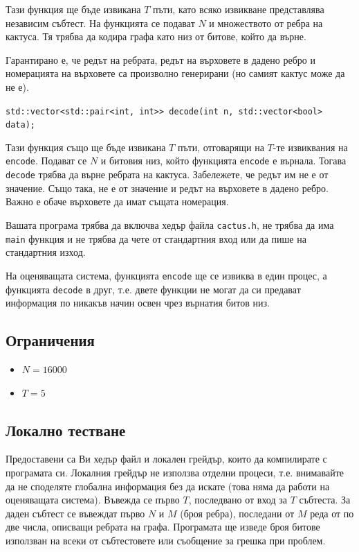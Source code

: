 \documentclass[12pt]{article}
\begin{document}
Тази функция ще бъде извикана $T$ пъти, като всяко извикване представлява независим събтест. На функцията се подават $N$ и множеството от ребра на кактуса. Тя трябва да кодира графа като низ от битове, който да върне.

Гарантирано е, че редът на ребрата, редът на върховете в дадено ребро и номерацията на върховете са произволно генерирани (но самият кактус може да не е).

{\footnotesize \verb|std::vector<std::pair<int, int>> decode(int n, std::vector<bool> data);|}

Тази функция също ще бъде извикана $T$ пъти, отговарящи на $T$-те извиквания на \verb|encode|. Подават се $N$ и битовия низ, който функцията \verb|encode| е върнала. Тогава \verb|decode| трябва да върне ребрата на кактуса. Забележете, че редът им не е от значение. Също така, не е от значение и редът на върховете в дадено ребро. Важно е обаче върховете да имат същата номерация.

Вашата програма трябва да включва хедър файла \verb|cactus.h|, не трябва да има \verb|main| функция и не трябва да чете от стандартния вход или да пише на стандартния изход.

На оценяващата система, функцията \verb|encode| ще се извиква в един процес, а функцията \verb|decode| в друг, т.е. двете функции не могат да си предават информация по никакъв начин освен чрез върнатия битов низ.

\subsection{Ограничения}

\vspace{0.1em}

\begin{itemize}
\item $ N = 16000 $
\item $ T = 5 $
\end{itemize}

\subsection{Локално тестване}

Предоставени са Ви хедър файл и локален грейдър, които да компилирате с програмата си. Локалния грейдър не използва отделни процеси, т.е. внимавайте да не споделяте глобална информация без да искате (това няма да работи на оценяващата система). Въвежда се първо $T$, последвано от вход за $T$ събтеста. За даден събтест се въвеждат първо $N$ и $M$ (броя ребра), последани от $M$ реда от по две числа, описващи ребрата на графа. Програмата ще изведе броя битове използван на всеки от събтестовете или съобщение за грешка при проблем.
\end{document}
